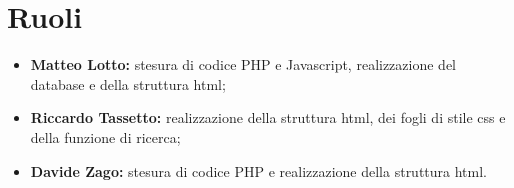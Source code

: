 \section{Ruoli}
\begin{itemize}
	\item \textbf{Matteo Lotto:} stesura di codice PHP e Javascript, realizzazione del database e della struttura html;
	\item \textbf{Riccardo Tassetto:} realizzazione della struttura html, dei fogli di stile css e della funzione di ricerca;
	\item \textbf{Davide Zago:} stesura di codice PHP e realizzazione della struttura html.
\end{itemize}